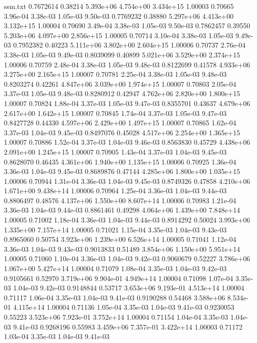 \begin{filecontents}{ssm.txt}
0.7672614 0.38214 5.393e+06 4.754e+00 3.434e+15 1.00003 0.70665 3.96e-04 3.38e-03 1.05e-03 9.50e-03
0.7769232 0.38880 5.297e+06 4.413e+00 3.132e+15 1.00004 0.70690 3.49e-04 3.38e-03 1.05e-03 9.50e-03
0.7862457 0.39550 5.203e+06 4.097e+00 2.856e+15 1.00005 0.70714 3.10e-04 3.38e-03 1.05e-03 9.49e-03
0.7952382 0.40223 5.111e+06 3.802e+00 2.604e+15 1.00006 0.70737 2.76e-04 3.38e-03 1.05e-03 9.49e-03
0.8039099 0.40899 5.021e+06 3.529e+00 2.374e+15 1.00006 0.70759 2.48e-04 3.38e-03 1.05e-03 9.48e-03
0.8122699 0.41578 4.933e+06 3.275e+00 2.165e+15 1.00007 0.70781 2.25e-04 3.38e-03 1.05e-03 9.48e-03
0.8203274 0.42261 4.847e+06 3.039e+00 1.974e+15 1.00007 0.70803 2.05e-04 3.37e-03 1.05e-03 9.48e-03
0.8280912 0.42947 4.762e+06 2.820e+00 1.800e+15 1.00007 0.70824 1.88e-04 3.37e-03 1.05e-03 9.47e-03
0.8355701 0.43637 4.679e+06 2.617e+00 1.642e+15 1.00007 0.70845 1.74e-04 3.37e-03 1.05e-03 9.47e-03
0.8427728 0.44330 4.597e+06 2.429e+00 1.497e+15 1.00007 0.70865 1.62e-04 3.37e-03 1.04e-03 9.45e-03
0.8497076 0.45028 4.517e+06 2.254e+00 1.365e+15 1.00007 0.70886 1.52e-04 3.37e-03 1.04e-03 9.46e-03
0.8563830 0.45729 4.438e+06 2.091e+00 1.245e+15 1.00007 0.70905 1.43e-04 3.37e-03 1.04e-03 9.45e-03
0.8628070 0.46435 4.361e+06 1.940e+00 1.135e+15 1.00006 0.70925 1.36e-04 3.36e-03 1.04e-03 9.45e-03
0.8689876 0.47144 4.285e+06 1.800e+00 1.035e+15 1.00006 0.70944 1.31e-04 3.36e-03 1.04e-03 9.45e-03
0.8749326 0.47858 4.210e+06 1.671e+00 9.438e+14 1.00006 0.70964 1.25e-04 3.36e-03 1.04e-03 9.44e-03
0.8806497 0.48576 4.137e+06 1.550e+00 8.607e+14 1.00006 0.70983 1.21e-04 3.36e-03 1.04e-03 9.44e-03
0.8861461 0.49298 4.064e+06 1.439e+00 7.848e+14 1.00005 0.71002 1.18e-04 3.36e-03 1.04e-03 9.44e-03
0.8914292 0.50024 3.993e+06 1.335e+00 7.157e+14 1.00005 0.71021 1.15e-04 3.35e-03 1.04e-03 9.43e-03
0.8965060 0.50754 3.923e+06 1.239e+00 6.526e+14 1.00005 0.71041 1.12e-04 3.36e-03 1.04e-03 9.43e-03
0.9013833 0.51489 3.854e+06 1.150e+00 5.951e+14 1.00005 0.71060 1.10e-04 3.36e-03 1.04e-03 9.42e-03
0.9060679 0.52227 3.786e+06 1.067e+00 5.427e+14 1.00004 0.71079 1.08e-04 3.35e-03 1.04e-03 9.42e-03
0.9105661 0.52970 3.719e+06 9.904e-01 4.949e+14 1.00004 0.71098 1.07e-04 3.35e-03 1.04e-03 9.42e-03
0.9148844 0.53717 3.653e+06 9.193e-01 4.513e+14 1.00004 0.71117 1.06e-04 3.35e-03 1.04e-03 9.41e-03
0.9190288 0.54468 3.588e+06 8.534e-01 4.115e+14 1.00004 0.71136 1.05e-04 3.35e-03 1.04e-03 9.41e-03
0.9230053 0.55223 3.523e+06 7.923e-01 3.752e+14 1.00004 0.71154 1.04e-04 3.35e-03 1.04e-03 9.41e-03
0.9268196 0.55983 3.459e+06 7.357e-01 3.422e+14 1.00003 0.71172 1.03e-04 3.35e-03 1.04e-03 9.41e-03

\end{filecontents}
